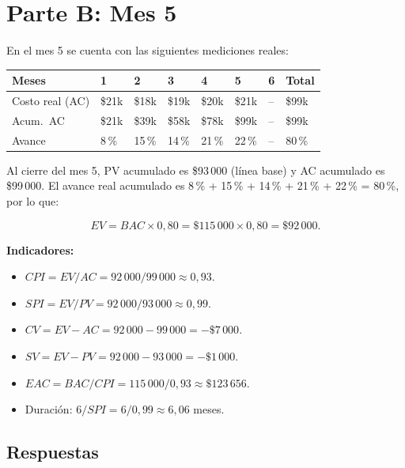 \documentclass[12pt,letterpaper]{article}
\begin{document}
\section*{Parte B: Mes 5}

En el mes 5 se cuenta con las siguientes mediciones reales:

\begin{table}[htbp]
\centering
\footnotesize
\begin{tabularx}{0.95\textwidth}{|>{\raggedright\arraybackslash}X|*{7}{C{1.5cm}|}}
\hline
{} \color{white}\textbf{Meses} &
\color{white}\textbf{1} &
\color{white}\textbf{2} &
\color{white}\textbf{3} &
\color{white}\textbf{4} &
\color{white}\textbf{5} &
\color{white}\textbf{6} &
\color{white}\textbf{Total} \\
\hline
Costo real (AC) & \$21k & \$18k & \$19k & \$20k & \$21k & -- & \$99k \\
\hline
Acum.\ AC & \$21k & \$39k & \$58k & \$78k & \$99k & -- & \$99k \\
\hline
Avance & 8\,\% & 15\,\% & 14\,\% & 21\,\% & 22\,\% & -- & 80\,\% \\
\hline
\end{tabularx}
\end{table}

Al cierre del mes 5, PV acumulado es \$93\,000 (línea base) y AC acumulado es
\$99\,000. El avance real acumulado es 8\,\% + 15\,\% + 14\,\% + 21\,\% +
22\,\% = 80\,\%, por lo que:

\[
EV = BAC \times 0{,}80 = \$115\,000 \times 0{,}80 = \$92\,000.
\]

\textbf{Indicadores:}
\begin{itemize}
  \item $CPI = EV/AC = 92\,000/99\,000 \approx 0{,}93$.
  \item $SPI = EV/PV = 92\,000/93\,000 \approx 0{,}99$.
  \item $CV = EV - AC = 92\,000 - 99\,000 = -\$7\,000$.
  \item $SV = EV - PV = 92\,000 - 93\,000 = -\$1\,000$.
  \item $EAC = BAC/CPI = 115\,000/0{,}93 \approx \$123\,656$.
  \item Duración: $6/SPI = 6/0{,}99 \approx 6{,}06$ meses.
\end{itemize}

\subsection*{Respuestas}
\end{document}
